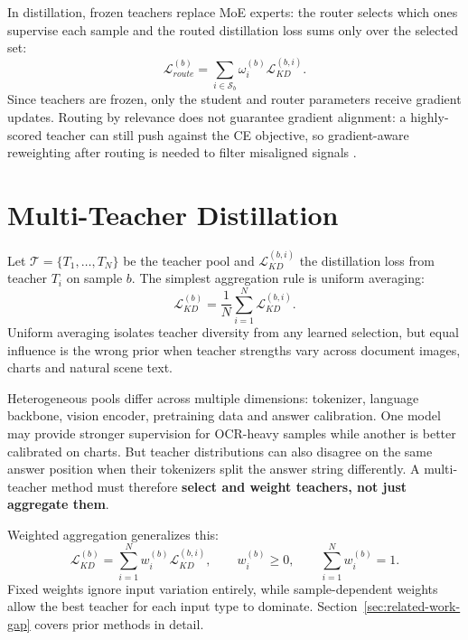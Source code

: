 In distillation, frozen teachers replace MoE experts: the router selects which
ones supervise each sample and the routed distillation loss sums only over the
selected set:
\begin{equation}
\mathcal{L}_{route}^{(b)}
=
\sum_{i\in\mathcal{S}_b}
\omega_i^{(b)}
\mathcal{L}_{KD}^{(b,i)}.
\end{equation}
Since teachers are frozen, only the student and router parameters receive
gradient updates. Routing by relevance does not guarantee gradient alignment:
a highly-scored teacher can still push against the CE objective, so
gradient-aware reweighting after routing is needed to filter misaligned signals
\cite{zhu2021studentcustomized,yuan2020reinforcedmultiteacherselection,yu2020gradient}.

\section{Multi-Teacher Distillation}

Let \(\mathcal{T}=\{T_1,\ldots,T_N\}\) be the teacher pool and
\(\mathcal{L}_{KD}^{(b,i)}\) the distillation loss from teacher \(T_i\) on
sample \(b\). The simplest aggregation rule is uniform averaging:
\begin{equation}
\mathcal{L}_{KD}^{(b)}
=
\frac{1}{N}\sum_{i=1}^{N}\mathcal{L}_{KD}^{(b,i)}.
\end{equation}
Uniform averaging isolates teacher diversity from any learned selection, but
equal influence is the wrong prior when teacher strengths vary across document
images, charts and natural scene text.

Heterogeneous pools differ across multiple dimensions: tokenizer, language backbone, vision encoder,
pretraining data and answer calibration. One model may provide stronger supervision for OCR-heavy samples while another
is better calibrated on charts. But teacher distributions can also disagree on
the same answer position when their tokenizers split the answer string
differently. A multi-teacher method must therefore \textbf{select and weight teachers,
not just aggregate them}.

Weighted aggregation generalizes this:
\begin{equation}
\mathcal{L}_{KD}^{(b)}
=
\sum_{i=1}^{N}w_i^{(b)}\mathcal{L}_{KD}^{(b,i)},
\qquad
w_i^{(b)}\ge0,
\qquad
\sum_{i=1}^{N}w_i^{(b)}=1.
\end{equation}
Fixed weights ignore input variation entirely, while sample-dependent weights
allow the best teacher for each input type to dominate.
Section~\ref{sec:related-work-gap} covers prior methods in detail.

